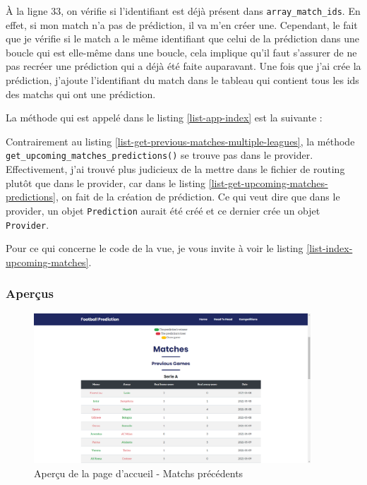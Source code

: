 \documentclass[a4paper,14pt]{extarticle}
\begin{document}
{À la ligne 33, on vérifie si l'identifiant est déjà présent dans \texttt{array\_match\_ids}. En effet, si mon match n'a pas de prédiction, il va m'en créer une. Cependant, le fait que je vérifie si le match a le même identifiant que celui de la prédiction dans une boucle qui est elle-même dans une boucle, cela implique qu'il faut s'assurer de ne pas recréer une prédiction qui a déjà été faite auparavant. Une fois que j'ai crée la prédiction, j'ajoute l'identifiant du match dans le tableau qui contient tous les ids des matchs qui ont une prédiction.

La méthode qui est appelé dans le listing \ref{list-app-index} est la suivante :


Contrairement au listing \ref{list-get-previous-matches-multiple-leagues}, la méthode \texttt{get\_upcoming\_matches\_predictions()} se trouve pas dans le provider. Effectivement, j'ai trouvé plus judicieux de la mettre dans le fichier de routing plutôt que dans le provider, car dans le listing \ref{list-get-upcoming-matches-predictions}, on fait de la création de prédiction. Ce qui veut dire que dans le provider, un objet \texttt{Prediction} aurait été créé et ce dernier crée un objet \texttt{Provider}. 
 
Pour ce qui concerne le code de la vue, je vous invite à voir le listing \ref{list-index-upcoming-matches}.


\subsubsection{Aperçus}



\begin{figure}[htp]
    \centering
    \includegraphics[width=28em]{../img/previousGamesAccueil.png}
    \caption{Aperçu de la page d'accueil - Matchs précédents}
    \label{fig:previousGamesAccueil}
\end{figure}

}
\end{document}
